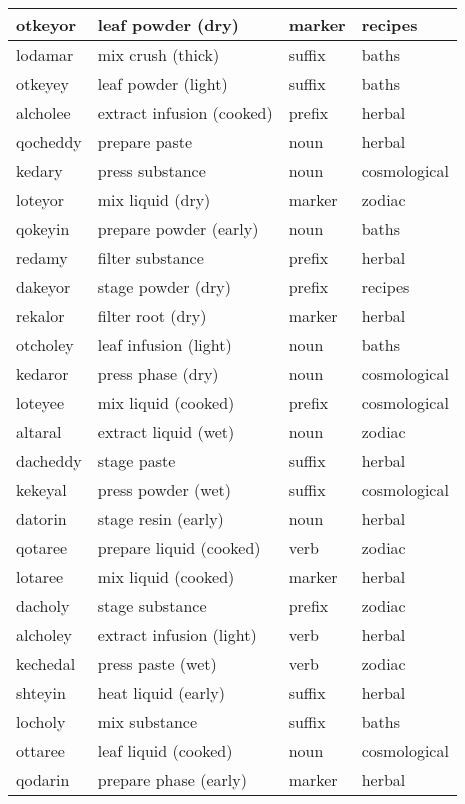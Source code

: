 \documentclass[12pt]{article}
\begin{document}
\begin{longtable}{|l|l|l|l|}
otkeyor & leaf powder (dry) & marker & recipes \\ \hline
lodamar & mix crush (thick) & suffix & baths \\ \hline
otkeyey & leaf powder (light) & suffix & baths \\ \hline
alcholee & extract infusion (cooked) & prefix & herbal \\ \hline
qocheddy & prepare paste & noun & herbal \\ \hline
kedary & press substance & noun & cosmological \\ \hline
loteyor & mix liquid (dry) & marker & zodiac \\ \hline
qokeyin & prepare powder (early) & noun & baths \\ \hline
redamy & filter substance & prefix & herbal \\ \hline
dakeyor & stage powder (dry) & prefix & recipes \\ \hline
rekalor & filter root (dry) & marker & herbal \\ \hline
otcholey & leaf infusion (light) & noun & baths \\ \hline
kedaror & press phase (dry) & noun & cosmological \\ \hline
loteyee & mix liquid (cooked) & prefix & cosmological \\ \hline
altaral & extract liquid (wet) & noun & zodiac \\ \hline
dacheddy & stage paste & suffix & herbal \\ \hline
kekeyal & press powder (wet) & suffix & cosmological \\ \hline
datorin & stage resin (early) & noun & herbal \\ \hline
qotaree & prepare liquid (cooked) & verb & zodiac \\ \hline
lotaree & mix liquid (cooked) & marker & herbal \\ \hline
dacholy & stage substance & prefix & zodiac \\ \hline
alcholey & extract infusion (light) & verb & herbal \\ \hline
kechedal & press paste (wet) & verb & zodiac \\ \hline
shteyin & heat liquid (early) & suffix & herbal \\ \hline
locholy & mix substance & suffix & baths \\ \hline
ottaree & leaf liquid (cooked) & noun & cosmological \\ \hline
qodarin & prepare phase (early) & marker & herbal \\ \hline

\end{longtable}
\end{document}

